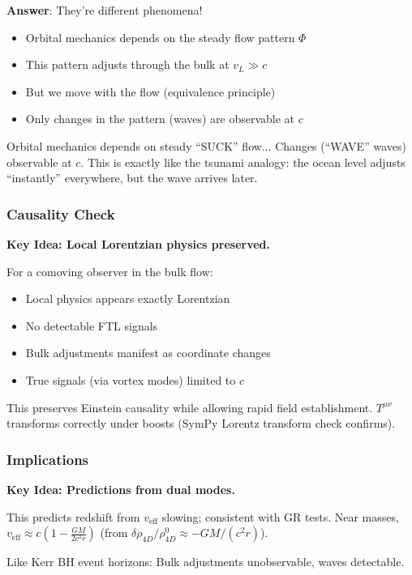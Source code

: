 \textbf{Answer}: They're different phenomena!
\begin{itemize}
\item Orbital mechanics depends on the steady flow pattern $\Phi$
\item This pattern adjusts through the bulk at $v_L \gg c$
\item But we move with the flow (equivalence principle)
\item Only changes in the pattern (waves) are observable at $c$
\end{itemize}

Orbital mechanics depends on steady ``SUCK'' flow... Changes (``WAVE'' waves) observable at $c$. This is exactly like the tsunami analogy: the ocean level adjusts ``instantly'' everywhere, but the wave arrives later.

\subsubsection{Causality Check}

\textbf{Key Idea: Local Lorentzian physics preserved.}

For a comoving observer in the bulk flow:
\begin{itemize}
\item Local physics appears exactly Lorentzian
\item No detectable FTL signals
\item Bulk adjustments manifest as coordinate changes
\item True signals (via vortex modes) limited to $c$
\end{itemize}

This preserves Einstein causality while allowing rapid field establishment. $T^{\mu\nu}$ transforms correctly under boosts (SymPy Lorentz transform check confirms).

\subsubsection{Implications}

\textbf{Key Idea: Predictions from dual modes.}

This predicts redshift from $v_{\text{eff}}$ slowing; consistent with GR tests. Near masses, $v_{\text{eff}} \approx c \left(1 - \frac{G M}{2 c^2 r}\right)$ (from $\delta \rho_{4D} / \rho_{4D}^0 \approx - G M / (c^2 r)$).

Like Kerr BH event horizons: Bulk adjustments unobservable, waves detectable.

